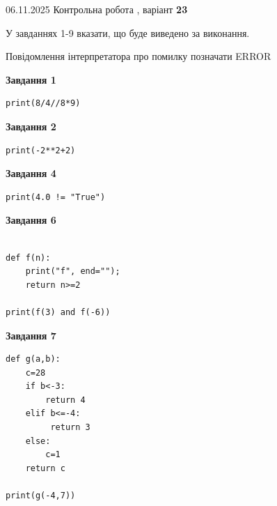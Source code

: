 \documentclass[12pt, ukrainian]{article}
\begin{document}
{\Large{06.11.2025 Контрольна робота , варіант  \No \textbf { 23 }\par}}
{
\begin {large}
У завданнях 1-9 вказати, що буде виведено за виконання.

Повідомлення інтерпретатора про помилку позначати ERROR

\begin{minipage}[t]{7.5cm}

\begin{center}
\textbf{Завдання 1}
\end{center}

\begin{verbatim}
print(8/4//8*9)
\end{verbatim}



\begin{center}
\textbf{Завдання 2}
\end{center}

\begin{verbatim}
print(-2**2+2)
\end{verbatim}



\begin{center}
\textbf{Завдання 4}
\end{center}

\begin{verbatim}
print(4.0 != "True")
\end{verbatim}



\begin{center}
\textbf{Завдання 6}
\end{center}

\begin{verbatim}

def f(n):
    print("f", end="");
    return n>=2

print(f(3) and f(-6))
\end{verbatim}



\begin{center}
\textbf{Завдання 7}
\end{center}

\begin{verbatim}
def g(a,b):
    c=28
    if b<-3:
        return 4
    elif b<=-4:
         return 3
    else: 
        c=1
    return c

print(g(-4,7))
\end{verbatim}


\end{minipage}
\end{large}}
\end{document}
